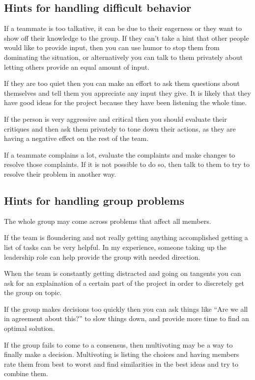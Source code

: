 \documentclass[
10pt, %
a4paper, %
oneside, %
headinclude,footinclude, %
BCOR5mm, %
]{scrartcl}
\begin{document}
\subsection{Hints for handling difficult behavior}

If a teammate is too talkative, it can be due to their eagerness or they
want to show off their knowledge to the group. If they can't take a hint
that other people would like to provide input, then you can use humor to
stop them from dominating the situation, or alternatively you can talk
to them privately about letting others provide an equal amount of input.

If they are too quiet then you can make an effort to ask them questions
about themselves and tell them you appreciate any input they give. It is
likely that they have good ideas for the project because they have been
listening the whole time.

If the person is very aggressive and critical then you should evaluate
their critiques and then ask them privately to tone down their actions,
as they are having a negative effect on the rest of the team.

If a teammate complains a lot, evaluate the complaints and make changes
to resolve those complaints. If it is not possible to do so, then talk
to them to try to resolve their problem in another way.

\subsection{Hints for handling group problems}

The whole group may come across problems that affect all members.

If the team is floundering and not really getting anything accomplished
getting a list of tasks can be very helpful. In my experience, someone
taking up the leadership role can help provide the group with needed
direction.

When the team is constantly getting distracted and going on tangents you
can ask for an explaination of a certain part of the project in order to
discretely get the group on topic.

If the group makes decisions too quickly then you can ask things like
``Are we all in agreement about this?'' to slow things down, and provide
more time to find an optimal solution.

If the group fails to come to a consensus, then multivoting may be a way
to finally make a decision. Multivoting is listing the choices and
having members rate them from best to worst and find similarities in the
best ideas and try to combine them.
\end{document}
